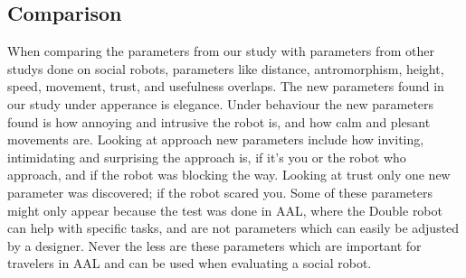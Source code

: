 \subsection{Comparison}
When comparing the parameters from our study with parameters from other studys done on social robots, parameters like distance, antromorphism, height, speed, movement, trust, and usefulness overlaps. The new parameters found in our study under apperance is elegance. Under behaviour the new parameters found is how annoying and intrusive the robot is, and how calm and plesant movements are. Looking at approach new parameters include how inviting, intimidating and surprising the approach is, if it's you or the robot who approach, and if the robot was blocking the way. Looking at trust only one new parameter was discovered; if the robot scared you. Some of these parameters might only appear because the test was done in AAL, where the Double robot can help with specific tasks, and are not parameters which can easily be adjusted by a designer. Never the less are these parameters which are important for travelers in AAL and can be used when evaluating a social robot. 